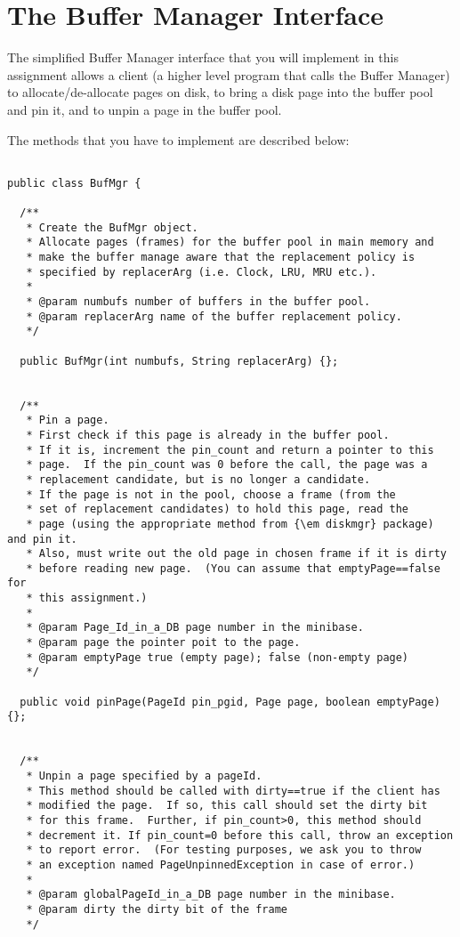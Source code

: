 \section{The Buffer Manager Interface}

The simplified Buffer Manager interface that you will 
implement in this assignment
allows a client (a higher level program that calls the Buffer Manager) to
allocate/de-allocate pages on disk, to bring a disk page into the buffer pool
and pin it, and to unpin a page in the buffer pool.  


The methods that you have to implement are described below:

\begin{verbatim}

public class BufMgr {

  /**
   * Create the BufMgr object.
   * Allocate pages (frames) for the buffer pool in main memory and
   * make the buffer manage aware that the replacement policy is
   * specified by replacerArg (i.e. Clock, LRU, MRU etc.).
   *
   * @param numbufs number of buffers in the buffer pool.
   * @param replacerArg name of the buffer replacement policy.
   */

  public BufMgr(int numbufs, String replacerArg) {};


  /** 
   * Pin a page.
   * First check if this page is already in the buffer pool.  
   * If it is, increment the pin_count and return a pointer to this 
   * page.  If the pin_count was 0 before the call, the page was a 
   * replacement candidate, but is no longer a candidate.
   * If the page is not in the pool, choose a frame (from the 
   * set of replacement candidates) to hold this page, read the 
   * page (using the appropriate method from {\em diskmgr} package) and pin it.
   * Also, must write out the old page in chosen frame if it is dirty 
   * before reading new page.  (You can assume that emptyPage==false for
   * this assignment.)
   *
   * @param Page_Id_in_a_DB page number in the minibase.
   * @param page the pointer poit to the page.
   * @param emptyPage true (empty page); false (non-empty page)
   */

  public void pinPage(PageId pin_pgid, Page page, boolean emptyPage) {};


  /**
   * Unpin a page specified by a pageId.
   * This method should be called with dirty==true if the client has
   * modified the page.  If so, this call should set the dirty bit 
   * for this frame.  Further, if pin_count>0, this method should 
   * decrement it. If pin_count=0 before this call, throw an exception
   * to report error.  (For testing purposes, we ask you to throw
   * an exception named PageUnpinnedException in case of error.)
   *
   * @param globalPageId_in_a_DB page number in the minibase.
   * @param dirty the dirty bit of the frame
   */


\end{verbatim}
